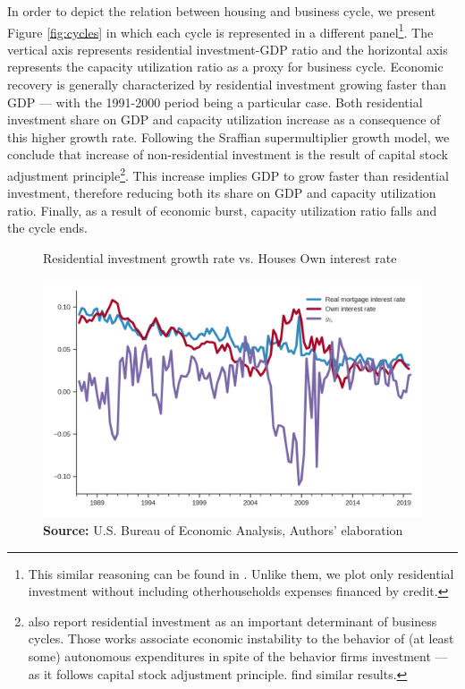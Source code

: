 \documentclass[11pt]{article}
\begin{document}
In order to depict the relation between housing and business cycle, we present Figure \ref{fig:cycles} in which each cycle is represented in a different panel\footnote{This similar reasoning can be found in \textcite{fiebiger_trend_2017}. Unlike them, we plot only residential investment without including otherhouseholds expenses financed by credit.}.
The vertical axis represents residential investment-GDP ratio and the horizontal axis represents the capacity utilization ratio  as a proxy for business cycle. Economic recovery is generally characterized by residential investment growing faster than GDP — with the 1991-2000 period being a particular case. Both residential investment share on GDP and capacity utilization increase as a consequence of this higher growth rate.
Following the Sraffian supermultiplier growth model, we conclude that increase of non-residential investment is the result of capital stock adjustment principle\footnote{\textcites{fiebiger_semi-autonomous_2018}{fiebiger_trend_2017} also report residential investment as an important determinant of business cycles. Those works associate economic instability to the behavior of (at least some) autonomous expenditures in spite of the behavior firms investment --- as it follows capital stock adjustment principle. \textcites{dejuan_hidden_2017}{teixeira_crescimento_2015} find similar results.}. This increase implies GDP to grow faster than residential investment, therefore reducing both its share on GDP and capacity utilization ratio. Finally, as a result of economic burst, capacity utilization ratio falls and the cycle ends.



\begin{figure}[htb]
	\centering
	\caption{Residential investment growth rate vs. Houses Own interest rate}
	\label{propria_investo}
	\includegraphics[width=.8\textwidth]{./figs/Own_gI}
	\caption*{\textbf{Source:} U.S. Bureau of Economic Analysis, Authors' elaboration}
\end{figure}
\end{document}
